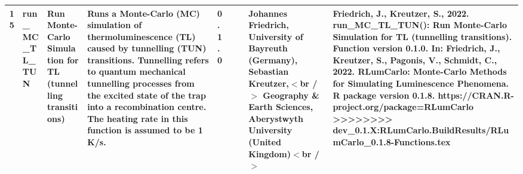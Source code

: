 \begin{table}[ht]
\begin{tabular}{rllllllll}
 \\ 
  15 & run\_MC\_TL\_TUN & Run Monte-Carlo Simulation for TL (tunnelling transitions) & Runs a Monte-Carlo (MC) simulation of thermoluminescence (TL) caused by tunnelling (TUN) transitions. Tunnelling refers to quantum mechanical tunnelling processes from the excited state of the trap into a recombination centre. The heating rate in this function is assumed to be 1 K/s. & 0.1.0
 &  &  & Johannes Friedrich, University of Bayreuth (Germany), Sebastian Kreutzer,$<$br /$>$ Geography \& Earth Sciences, Aberystwyth University (United Kingdom)$<$br /$>$ & Friedrich, J., Kreutzer, S., 2022. run\_MC\_TL\_TUN(): Run Monte-Carlo Simulation for TL (tunnelling transitions). Function version 0.1.0. In: Friedrich, J., Kreutzer, S., Pagonis, V., Schmidt, C., 2022. RLumCarlo: Monte-Carlo Methods for Simulating Luminescence Phenomena. R package version 0.1.8. https://CRAN.R-project.org/package=RLumCarlo
>>>>>>>> dev_0.1.X:RLumCarlo.BuildResults/RLumCarlo_0.1.8-Functions.tex
 \\ 
   \hline
\end{tabular}
\end{table}

